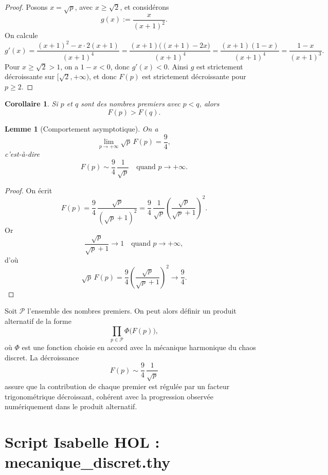 \documentclass[12pt,a4paper]{article}
\newtheorem{lemma}{Lemme}
\newtheorem{corollary}{Corollaire}
\begin{document}
\begin{proof}
Posons $x = \sqrt{p}$, avec $x \ge \sqrt{2}$, et considérons
\[
g(x) := \frac{x}{(x+1)^{2}}.
\]
On calcule
\[
g'(x)
= \frac{(x+1)^{2} - x \cdot 2(x+1)}{(x+1)^{4}}
= \frac{(x+1)\bigl((x+1) - 2x\bigr)}{(x+1)^{4}}
= \frac{(x+1)(1 - x)}{(x+1)^{4}}
= \frac{1 - x}{(x+1)^{3}}.
\]
Pour $x \ge \sqrt{2} > 1$, on a $1 - x < 0$, donc $g'(x) < 0$. Ainsi $g$ est strictement décroissante sur $[\sqrt{2},+\infty)$, et donc $F(p)$ est strictement décroissante pour $p \ge 2$.
\end{proof}

\begin{corollary}
Si $p$ et $q$ sont des nombres premiers avec $p < q$, alors
\[
F(p) > F(q).
\]
\end{corollary}

\begin{lemma}[Comportement asymptotique]
On a
\[
\lim_{p \to +\infty} \sqrt{p}\,F(p) = \frac{9}{4},
\]
c'est-à-dire
\[
F(p) \sim \frac{9}{4}\,\frac{1}{\sqrt{p}}
\quad \text{quand } p \to +\infty.
\]
\end{lemma}

\begin{proof}
On écrit
\[
F(p)
= \frac{9}{4}\,\frac{\sqrt{p}}{(\sqrt{p}+1)^{2}}
= \frac{9}{4}\,\frac{1}{\sqrt{p}}\left(\frac{\sqrt{p}}{\sqrt{p}+1}\right)^{2}.
\]
Or
\[
\frac{\sqrt{p}}{\sqrt{p}+1} \longrightarrow 1
\quad \text{quand } p \to +\infty,
\]
d'où
\[
\sqrt{p}\,F(p)
= \frac{9}{4}\left(\frac{\sqrt{p}}{\sqrt{p}+1}\right)^{2}
\longrightarrow \frac{9}{4}.
\]
\end{proof}

Soit $\mathcal{P}$ l'ensemble des nombres premiers. On peut alors définir un produit alternatif de la forme
\[
\prod_{p \in \mathcal{P}} \Phi\bigl(F(p)\bigr),
\]
où $\Phi$ est une fonction choisie en accord avec la mécanique harmonique du chaos discret.
La décroissance
\[
F(p) \sim \frac{9}{4}\,\frac{1}{\sqrt{p}}
\]
assure que la contribution de chaque premier est régulée par un facteur trigonométrique
décroissant, cohérent avec la progression observée numériquement dans le produit alternatif.



\section{Script Isabelle HOL : mecanique\_discret.thy}
\end{document}
